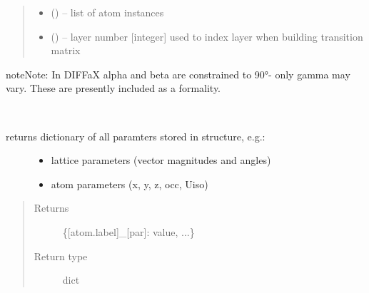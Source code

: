 \documentclass[letterpaper,10pt,english]{sphinxmanual}
\begin{document}
\begin{fulllineitems}
\begin{fulllineitems}
\begin{quote}
\begin{description}
\begin{itemize}
\item {} 
 (\sphinxstyleliteralemphasis{*}) -- list of atom instances   

\item {} 
 (\sphinxstyleliteralemphasis{*}) -- layer number {[}integer{]} used to index layer when building transition matrix

\end{itemize}

\end{description}\end{quote}

\begin{sphinxadmonition}{note}{Note:}
In DIFFaX alpha and beta are constrained to 90°- only gamma may vary. These are presently
included as a formality.
\end{sphinxadmonition}

\end{fulllineitems}


\begin{fulllineitems}
\label{\detokenize{rst/structure:mstack.structure.Structure.get_all_par}}~\begin{description}
\item[{returns dictionary of all paramters stored in structure, e.g.:}] \leavevmode\begin{itemize}
\item {} 
lattice parameters (vector magnitudes and angles)

\item {} 
atom parameters (x, y, z, occ, Uiso)

\end{itemize}

\end{description}
\begin{quote}\begin{description}
\item[{Returns}] \leavevmode
\{{[}atom.label{]}\_{[}par{]}: value, ...\}

\item[{Return type}] \leavevmode
dict

\end{description}\end{quote}


\end{fulllineitems}
\end{fulllineitems}
\end{document}
